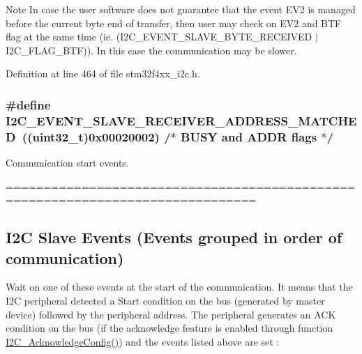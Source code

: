 \begin{DoxyNote}{Note}
In case the user software does not guarantee that the event E\-V2 is managed before the current byte end of transfer, then user may check on E\-V2 and B\-T\-F flag at the same time (ie. (I2\-C\-\_\-\-E\-V\-E\-N\-T\-\_\-\-S\-L\-A\-V\-E\-\_\-\-B\-Y\-T\-E\-\_\-\-R\-E\-C\-E\-I\-V\-E\-D $|$ I2\-C\-\_\-\-F\-L\-A\-G\-\_\-\-B\-T\-F)). In this case the communication may be slower. 
\end{DoxyNote}


Definition at line 464 of file stm32f4xx\-\_\-i2c.\-h.

\hypertarget{group___i2_c___events_ga6cf0e334704618b024eee604849f50f7}{
\subsubsection[{I2\-C\-\_\-\-E\-V\-E\-N\-T\-\_\-\-S\-L\-A\-V\-E\-\_\-\-R\-E\-C\-E\-I\-V\-E\-R\-\_\-\-A\-D\-D\-R\-E\-S\-S\-\_\-\-M\-A\-T\-C\-H\-E\-D}]{\setlength{\rightskip}{0pt plus 5cm}\#define I2\-C\-\_\-\-E\-V\-E\-N\-T\-\_\-\-S\-L\-A\-V\-E\-\_\-\-R\-E\-C\-E\-I\-V\-E\-R\-\_\-\-A\-D\-D\-R\-E\-S\-S\-\_\-\-M\-A\-T\-C\-H\-E\-D~((uint32\-\_\-t)0x00020002) /$\ast$ B\-U\-S\-Y and A\-D\-D\-R flags $\ast$/}}\label{group___i2_c___events_ga6cf0e334704618b024eee604849f50f7}


Communication start events. 

=============================================================================== \subsection*{I2\-C Slave Events (Events grouped in order of communication) }

Wait on one of these events at the start of the communication. It means that the I2\-C peripheral detected a Start condition on the bus (generated by master device) followed by the peripheral address. The peripheral generates an A\-C\-K condition on the bus (if the acknowledge feature is enabled through function \hyperlink{group___i2_c_ga7bb44e894d68a7991f564c43fb187486}{I2\-C\-\_\-\-Acknowledge\-Config()}) and the events listed above are set \-:

